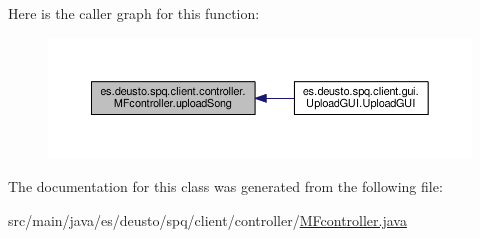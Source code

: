 Here is the caller graph for this function\+:\nopagebreak
\begin{figure}[H]
\begin{center}
\leavevmode
\includegraphics[width=350pt]{classes_1_1deusto_1_1spq_1_1client_1_1controller_1_1_m_fcontroller_a1085b9339fc5c96ceb989e31d27148f4_icgraph}
\end{center}
\end{figure}




The documentation for this class was generated from the following file\+:\begin{DoxyCompactItemize}
\item 
src/main/java/es/deusto/spq/client/controller/\hyperlink{_m_fcontroller_8java}{M\+Fcontroller.\+java}\end{DoxyCompactItemize}
